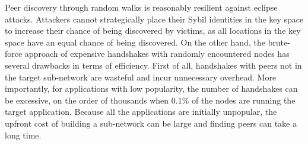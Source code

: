 Peer discovery through random walks is reasonably resilient against eclipse attacks.
Attackers cannot strategically place their Sybil identities in the key space to increase their chance of being discovered by victims, as all locations in the key space have an equal chance of being discovered.
On the other hand, the brute-force approach of expensive handshakes with randomly encountered nodes has several drawbacks in terms of efficiency.
First of all, handshakes with peers not in the target sub-network are wasteful and incur unnecessary overhead. %
More importantly, for applications with low popularity, the number of handshakes can be excessive, \ie on the order of thousands when 0.1\% of the nodes are running the target application. 
Because all the applications are initially unpopular, the upfront cost of building a sub-network can be large and finding peers can take a long time.  
